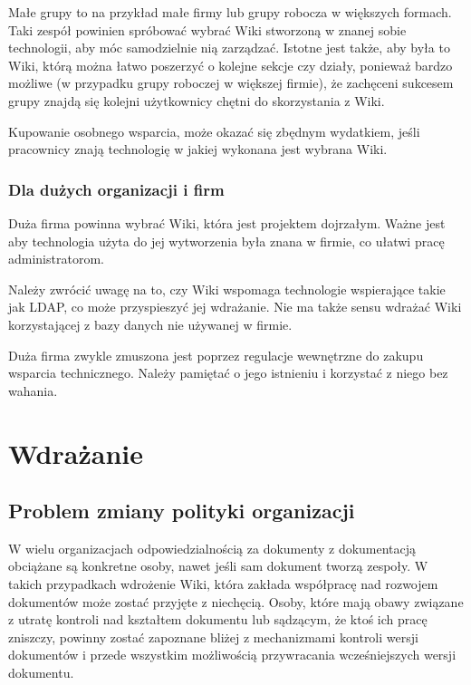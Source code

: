 \documentclass{article}
\begin{document}
			Małe grupy to na przykład małe firmy lub grupy robocza w większych formach. Taki zespół powinien spróbować wybrać Wiki stworzoną w znanej sobie technologii, aby móc samodzielnie nią zarządzać. Istotne jest także, aby była to Wiki, którą można łatwo poszerzyć o kolejne sekcje czy działy, ponieważ bardzo możliwe (w przypadku grupy roboczej w większej firmie), że zachęceni sukcesem grupy znajdą się kolejni użytkownicy chętni do skorzystania z Wiki. 
	

	Kupowanie osobnego wsparcia, może okazać się zbędnym wydatkiem, jeśli pracownicy znają technologię w jakiej wykonana jest wybrana Wiki.
		
		\subsubsection{Dla dużych organizacji i firm}
		

		Duża firma powinna wybrać Wiki, która jest projektem dojrzałym. Ważne jest aby technologia użyta do jej wytworzenia była znana w firmie, co ułatwi pracę administratorom.

	Należy zwrócić uwagę na to, czy Wiki wspomaga technologie wspierające takie jak LDAP, co może przyspieszyć jej wdrażanie. Nie ma także sensu wdrażać Wiki korzystającej z bazy danych nie używanej w firmie. 

	Duża firma zwykle zmuszona jest poprzez regulacje wewnętrzne do zakupu wsparcia technicznego. Należy pamiętać o jego istnieniu i korzystać z niego bez wahania.

\newpage
\section{Wdrażanie}
	\subsection{Problem zmiany polityki organizacji}


	W wielu organizacjach odpowiedzialnością za dokumenty z dokumentacją obciążane są konkretne osoby, nawet jeśli sam dokument tworzą zespoły. W takich przypadkach wdrożenie Wiki, która zakłada współpracę nad rozwojem dokumentów może zostać przyjęte z niechęcią. Osoby, które mają obawy związane z utratę kontroli nad kształtem dokumentu lub sądzącym, że ktoś ich pracę zniszczy, powinny zostać zapoznane bliżej z mechanizmami kontroli wersji dokumentów i przede wszystkim możliwością przywracania wcześniejszych wersji dokumentu. 
\end{document}
